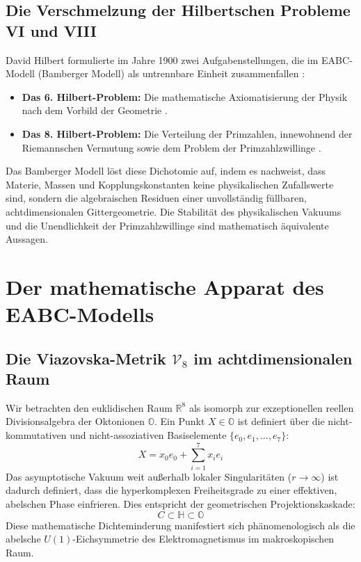\documentclass[11pt,a4paper]{article}
\newcommand{\R}{\mathbb{R}}
\newcommand{\Halg}{\mathbb{H}}
\newcommand{\Oalg}{\mathbb{O}}
\newcommand{\Vmet}{\mathcal{V}_8}
\theoremstyle{definition}
\begin{document}
	\subsection{Die Verschmelzung der Hilbertschen Probleme VI und VIII}
	David Hilbert formulierte im Jahre 1900 zwei Aufgabenstellungen, die im EABC-Modell (Bamberger Modell) als untrennbare Einheit zusammenfallen \cite{hilbert}:
	\begin{itemize}
		\item \textbf{Das 6. Hilbert-Problem:} Die mathematische Axiomatisierung der Physik nach dem Vorbild der Geometrie \cite{hilbert}.
		\item \textbf{Das 8. Hilbert-Problem:} Die Verteilung der Primzahlen, innewohnend der Riemannschen Vermutung sowie dem Problem der Primzahlzwillinge \cite{hilbert}.
	\end{itemize}
	Das Bamberger Modell löst diese Dichotomie auf, indem es nachweist, dass Materie, Massen und Kopplungskonstanten keine physikalischen Zufallswerte sind, sondern die algebraischen Residuen einer unvollständig füllbaren, achtdimensionalen Gittergeometrie. Die Stabilität des physikalischen Vakuums und die Unendlichkeit der Primzahlzwillinge sind mathematisch äquivalente Aussagen.
	
	\section{Der mathematische Apparat des EABC-Modells}
	
	\subsection{Die Viazovska-Metrik $\Vmet$ im achtdimensionalen Raum}
	Wir betrachten den euklidischen Raum $\R^8$ als isomorph zur exzeptionellen reellen Divisionsalgebra der Oktonionen $\Oalg$. Ein Punkt $X \in \Oalg$ ist definiert über die nicht-kommutativen und nicht-assoziativen Basiselemente $\{e_0, e_1, \dots, e_7\}$:
	\begin{equation}
		X = x_0 e_0 + \sum_{i=1}^7 x_i e_i
	\end{equation}
	Das asymptotische Vakuum weit außerhalb lokaler Singularitäten ($r \rightarrow \infty$) ist dadurch definiert, dass die hyperkomplexen Freiheitsgrade zu einer effektiven, abelschen Phase einfrieren. Dies entspricht der geometrischen Projektionskaskade:
	\begin{equation}
		C \subset \Halg \subset \Oalg
	\end{equation}
	Diese mathematische Dichteminderung manifestiert sich phänomenologisch als die abelsche $U(1)$-Eichsymmetrie des Elektromagnetismus im makroskopischen Raum.
	
\end{document}
